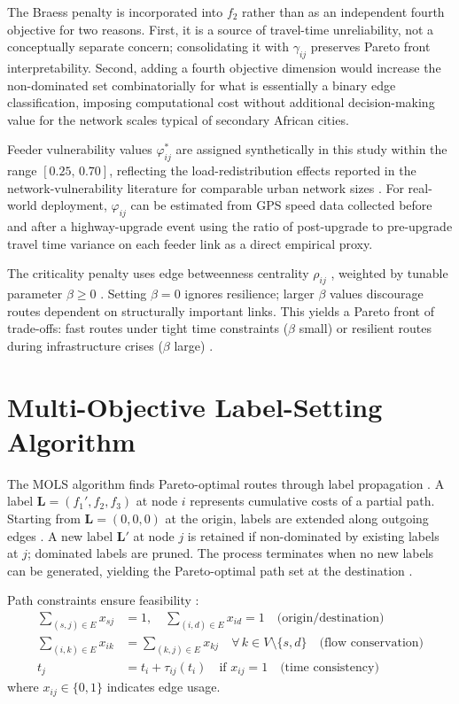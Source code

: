 \documentclass[paper=A4, 12pt, mathscr]{report}
\begin{document}
	The Braess penalty is incorporated into $f_2$ rather than as an
	independent fourth objective for two reasons. First, it is a source of
	travel-time unreliability, not a conceptually separate concern;
	consolidating it with $\gamma_{ij}$ preserves Pareto front
	interpretability. Second, adding a fourth objective dimension would
	increase the non-dominated set combinatorially for what is essentially
	a binary edge classification, imposing computational cost without
	additional decision-making value for the network scales typical of
	secondary African cities.
	
	Feeder vulnerability values $\varphi_{ij}^{*}$ are assigned
	synthetically in this study within the range $[0.25,\,0.70]$, reflecting
	the load-redistribution effects reported in the network-vulnerability
	literature for comparable urban network sizes \cite{11}. For real-world
	deployment, $\varphi_{ij}$ can be estimated from GPS speed data collected
	before and after a highway-upgrade event using the ratio of
	post-upgrade to pre-upgrade travel time variance on each feeder link as a
	direct empirical proxy.
	
	The criticality penalty uses edge betweenness centrality $\rho_{ij}$
	\cite{11}, weighted by tunable parameter $\beta\ge0$ \cite{6}. Setting
	$\beta=0$ ignores resilience; larger $\beta$ values discourage routes
	dependent on structurally important links. This yields a Pareto front of
	trade-offs: fast routes under tight time constraints ($\beta$ small) or
	resilient routes during infrastructure crises ($\beta$ large)
	\cite{16,du,hao2024}.
	
	\section{Multi-Objective Label-Setting Algorithm}
	
	The MOLS algorithm finds Pareto-optimal routes through label propagation
	\cite{14,16}. A label $\mathbf{L}=(f_1',f_2,f_3)$ at node $i$ represents
	cumulative costs of a partial path. Starting from
	$\mathbf{L}=(0,0,0)$ at the origin, labels are extended along outgoing
	edges \cite{du}. A new label $\mathbf{L}'$ at node $j$ is retained if
	non-dominated by existing labels at $j$; dominated labels are pruned.
	The process terminates when no new labels can be generated, yielding the
	Pareto-optimal path set at the destination \cite{14,16}.
	
	Path constraints ensure feasibility \cite{15}:
	\begin{align}
		\sum_{(s,j)\in E} x_{sj} &= 1,\quad
		\sum_{(i,d)\in E} x_{id} = 1
		\quad\text{(origin/destination)} \\[2pt]
		\sum_{(i,k)\in E} x_{ik} &= \sum_{(k,j)\in E} x_{kj}
		\quad\forall\,k\in V\setminus\{s,d\}
		\quad\text{(flow conservation)} \\[2pt]
		t_j &= t_i + \tau_{ij}(t_i)\quad\text{if }x_{ij}=1
		\quad\text{(time consistency)}
	\end{align}
	where $x_{ij}\in\{0,1\}$ indicates edge usage.
	
\end{document}
